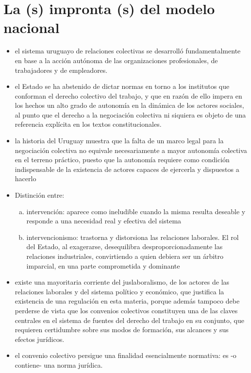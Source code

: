 \documentclass[spanish,12pt,a4paper,titlepage]{report}
\begin{document}
\section{La (s) impronta (s) del modelo nacional}

\begin{itemize}
\item el sistema uruguayo de relaciones colectivas se desarrolló fundamentalmente en base a la acción autónoma de las organizaciones profesionales, de trabajadores y de empleadores.

\item el Estado se ha abstenido de dictar normas en torno a los institutos que conforman el derecho colectivo del trabajo, y que en razón de ello impera en los hechos un alto grado de autonomía en la dinámica de los actores sociales, al punto que el derecho a la negociación colectiva ni siquiera es objeto de una referencia explícita en los textos constitucionales.
\item la historia del Uruguay muestra que la falta de un marco legal para la negociación colectiva no equivale necesariamente a mayor autonomía colectiva en el terreno práctico, puesto que la autonomía requiere como condición indispensable de la existencia de actores capaces de ejercerla y dispuestos a hacerlo
\item Distinción entre:
\begin{enumerate}[a)]
\item intervención: aparece como ineludible cuando la misma resulta deseable y responde a una necesidad real y efectiva del sistema
\item intervencionismo: trastorna y distorsiona las relaciones laborales. El rol del Estado, al exagerarse, desequilibra desproporcionadamente las relaciones industriales, convirtiendo a quien debiera ser un árbitro imparcial, en una parte comprometida y dominante
\end{enumerate}
\item existe una mayoritaria corriente del juslaboralismo, de los actores de las relaciones laborales y del sistema político y económico, que justifica la existencia de una regulación en esta materia, porque además tampoco debe perderse de vista que los convenios colectivos constituyen una de las claves centrales en el sistema de fuentes del derecho del trabajo en su conjunto, que requieren certidumbre sobre sus modos de formación, sus alcances y sus efectos jurídicos.
\item el convenio colectivo persigue una finalidad esencialmente normativa: es -o contiene- una norma jurídica.
\end{itemize}
\end{document}

